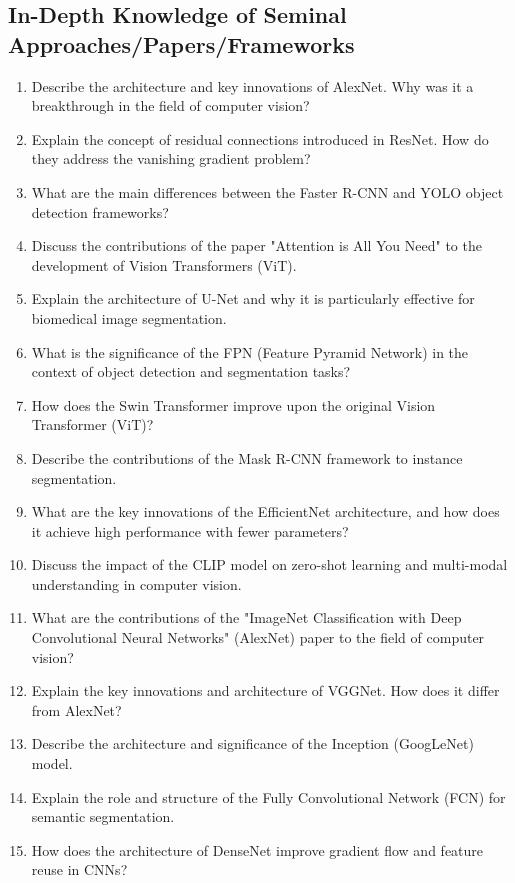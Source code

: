 \documentclass[12pt]{article}
\begin{document}
\subsection{In-Depth Knowledge of Seminal Approaches/Papers/Frameworks}

\begin{enumerate}
    \item Describe the architecture and key innovations of AlexNet. Why was it a breakthrough in the field of computer vision?
    \item Explain the concept of residual connections introduced in ResNet. How do they address the vanishing gradient problem?
    \item What are the main differences between the Faster R-CNN and YOLO object detection frameworks?
    \item Discuss the contributions of the paper "Attention is All You Need" to the development of Vision Transformers (ViT).
    \item Explain the architecture of U-Net and why it is particularly effective for biomedical image segmentation.
    \item What is the significance of the FPN (Feature Pyramid Network) in the context of object detection and segmentation tasks?
    \item How does the Swin Transformer improve upon the original Vision Transformer (ViT)?
    \item Describe the contributions of the Mask R-CNN framework to instance segmentation.
    \item What are the key innovations of the EfficientNet architecture, and how does it achieve high performance with fewer parameters?
    \item Discuss the impact of the CLIP model on zero-shot learning and multi-modal understanding in computer vision.
    \item What are the contributions of the "ImageNet Classification with Deep Convolutional Neural Networks" (AlexNet) paper to the field of computer vision?
    \item Explain the key innovations and architecture of VGGNet. How does it differ from AlexNet?
    \item Describe the architecture and significance of the Inception (GoogLeNet) model.
    \item Explain the role and structure of the Fully Convolutional Network (FCN) for semantic segmentation.
    \item How does the architecture of DenseNet improve gradient flow and feature reuse in CNNs?

\end{enumerate}
\end{document}
